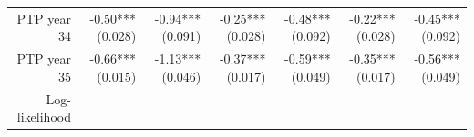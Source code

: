 \documentclass[]{article}
\begin{document}
\begin{longtable}[c]{@{}rrrrrrr@{}}
\begin{minipage}[t]{0.12\columnwidth}
PTP year 34
\strut\end{minipage} &
\begin{minipage}[t]{0.11\columnwidth}\raggedleft\strut
-0.50*** (0.028)
\strut\end{minipage} &
\begin{minipage}[t]{0.12\columnwidth}\raggedleft\strut
-0.94*** (0.091)
\strut\end{minipage} &
\begin{minipage}[t]{0.11\columnwidth}\raggedleft\strut
-0.25*** (0.028)
\strut\end{minipage} &
\begin{minipage}[t]{0.12\columnwidth}\raggedleft\strut
-0.48*** (0.092)
\strut\end{minipage} &
\begin{minipage}[t]{0.11\columnwidth}\raggedleft\strut
-0.22*** (0.028)
\strut\end{minipage} &
\begin{minipage}[t]{0.11\columnwidth}\raggedleft\strut
-0.45*** (0.092)
\strut\end{minipage}\tabularnewline
\begin{minipage}[t]{0.12\columnwidth}\raggedleft\strut
PTP year 35
\strut\end{minipage} &
\begin{minipage}[t]{0.11\columnwidth}\raggedleft\strut
-0.66*** (0.015)
\strut\end{minipage} &
\begin{minipage}[t]{0.12\columnwidth}\raggedleft\strut
-1.13*** (0.046)
\strut\end{minipage} &
\begin{minipage}[t]{0.11\columnwidth}\raggedleft\strut
-0.37*** (0.017)
\strut\end{minipage} &
\begin{minipage}[t]{0.12\columnwidth}\raggedleft\strut
-0.59*** (0.049)
\strut\end{minipage} &
\begin{minipage}[t]{0.11\columnwidth}\raggedleft\strut
-0.35*** (0.017)
\strut\end{minipage} &
\begin{minipage}[t]{0.11\columnwidth}\raggedleft\strut
-0.56*** (0.049)
\strut\end{minipage}\tabularnewline
\begin{minipage}[t]{0.12\columnwidth}\raggedleft\strut
Log-likelihood
\strut\end{minipage} &
\begin{minipage}[t]{0.11\columnwidth}\raggedleft\strut

\end{minipage}
\end{longtable}
\end{document}
